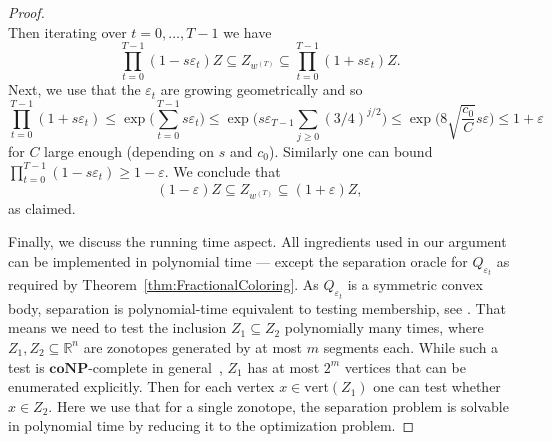 \documentclass[12pt,english]{article}
\theoremstyle{theorem}
\theoremstyle{remark}
\providecommand{\setR}{\mathbb{R}}
\newcommand{\eps}{\varepsilon}
\begin{document}
\begin{proof}
\[  \]
  Then iterating over $t=0,\ldots,T-1$ we have
  \[
   \prod_{t=0}^{T-1} (1-s \varepsilon_t) Z \subseteq Z_{w^{(T)}} \subseteq \prod_{t=0}^{T-1} (1+s \varepsilon_t) Z.
 \]
 Next, we use that the $\varepsilon_t$ are growing geometrically and so
 \[
   \prod_{t=0}^{T-1} (1+s \varepsilon_t) \leq \exp\Big( \sum_{t=0}^{T-1} s \varepsilon_t\Big)
   \leq \exp\Big(s\varepsilon_{T-1} \sum_{j \geq 0} (3/4)^{j/2}\Big) \leq \exp\Big(8\sqrt{\frac{c_0}{C}} s \varepsilon\Big) \leq 1+\varepsilon
 \]
 for $C$ large enough (depending on $s$ and $c_0$). Similarly one can bound $\prod_{t=0}^{T-1} (1-s \varepsilon_t) \geq 1-\varepsilon$.
We conclude that
\[
  (1-\varepsilon) Z \subseteq Z_{w^{(T)}} \subseteq (1+\varepsilon) Z,
\]
as claimed.

Finally, we discuss the running time aspect. All ingredients used in our argument can be implemented in polynomial time --- except the separation oracle for $Q_{\varepsilon_t}$ as required by Theorem~\ref{thm:FractionalColoring}. As $Q_{\varepsilon_t}$ is a symmetric convex body, separation is polynomial-time equivalent to testing membership, see \cite{GroetschelLovaszSchrijver1988}. That means we need to test the inclusion $Z_1 \subseteq Z_2$ polynomially many times, where $Z_1,Z_2 \subseteq \setR^n$ are zonotopes generated by at most $m$ segments each. While such a test is $\mathbf{coNP}$-complete in general~\cite{KulmburgAlthoff2021}, $Z_1$ has at most $2^m$ vertices that can be enumerated explicitly. Then for each vertex $x \in \textrm{vert}(Z_1)$ one can test whether $x \in Z_2$. Here we use that for a single zonotope, the separation problem is solvable in polynomial time by reducing it to the optimization problem.
\end{proof}
\end{document}
